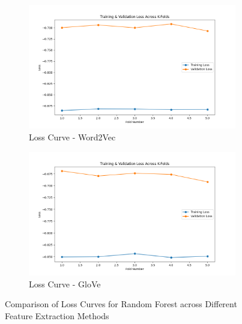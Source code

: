 \begin{figure}[H]
    \begin{subfigure}[b]{0.44\textwidth}
        \includegraphics[width=\textwidth]{img/report_info/img/1.4.RF/best_random_forest_word2vec_loss.png}
        \caption{Loss Curve - Word2Vec}
        \label{fig:rf-word2vec-loss}
    \end{subfigure}
    \begin{subfigure}[b]{0.44\textwidth}
        \includegraphics[width=\textwidth]{img/report_info/img/1.4.RF/best_random_forest_glove_loss.png}
        \caption{Loss Curve - GloVe}
        \label{fig:rf-glove-loss}
    \end{subfigure}
    
    \caption{Comparison of Loss Curves for Random Forest across Different Feature Extraction Methods}
    \label{fig:rf-loss-group}
\end{figure}

